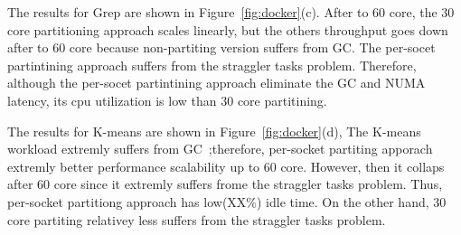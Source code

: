 \fi


\ifkor
The results for Grep are shown in Figure~\ref{fig:docker}(c).
After to 60 core, the 30 core partitioning approach scales linearly, but
the others throughput goes down after to 60 core because non-partiting
version suffers from GC.
The per-socet partintining approach suffers from the straggler tasks problem.
Therefore, although the per-socet partintining approach eliminate the GC and
NUMA latency, its cpu utilization is low than 30 core partitining.
\else 

\fi


\ifkor
The results for K-means are shown in Figure~\ref{fig:docker}(d),
The K-means workload extremly suffers from GC~\cite{Ahsan2016SVS};therefore,
per-socket partiting apporach extremly better performance scalability up to 60 core.
However, then it collaps after 60 core since it extremly suffers frome the
straggler tasks problem.
Thus, per-socket partitiong approach has low(XX\%) idle time.
On the other hand, 30 core partiting relativey less suffers from the straggler
tasks problem.
\else 

\fi

